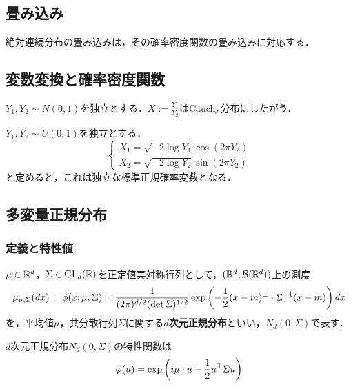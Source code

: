 \documentclass[uplatex,dvipdfmx]{jsreport}
\begin{document}
\subsection{畳み込み}

\begin{tcolorbox}[colframe=ForestGreen, colback=ForestGreen!10!white,breakable,colbacktitle=ForestGreen!40!white,coltitle=black,fonttitle=\bfseries\sffamily,
title=]
    絶対連続分布の畳み込みは，その確率密度関数の畳み込みに対応する．
\end{tcolorbox}

\subsection{変数変換と確率密度関数}

\begin{example}[独立正規分布の比はCauchy分布]
    $Y_1,Y_2\sim N(0,1)$を独立とする．$X:=\frac{Y_1}{Y_2}$はCauchy分布にしたがう．
\end{example}

\begin{example}
    $Y_1,Y_2\sim U(0,1)$を独立とする．
    \[\begin{cases}
        X_1=\sqrt{-2\log Y_1}\cos(2\pi Y_2)\\
        X_2=\sqrt{-2\log Y_2}\sin(2\pi Y_2)
    \end{cases}\]
    と定めると，これは独立な標準正規確率変数となる．
\end{example}

\subsection{多変量正規分布}

\subsubsection{定義と特性値}

\begin{definition}
    $\mu\in\mathbb{R}^d$，$\Sigma\in\mathrm{GL}_d(\mathbb{R})$を正定値実対称行列として，$(\mathbb{R}^d,\mathcal{B}(\mathbb{R}^d))$上の測度
    \[\mu_{\mu,\Sigma}(dx)=\phi(x;\mu,\Sigma)=\frac{1}{(2\pi)^{d/2}(\det\Sigma)^{1/2}}\exp\left(-\frac{1}{2}(x-m)^\perp\cdot\Sigma^{-1}(x-m)\right)dx\]
    を，平均値$\mu$，共分散行列$\Sigma$に関する\textbf{$d$次元正規分布}といい，$N_d(0,\Sigma)$で表す．
\end{definition}

\begin{proposition}
    $d$次元正規分布$N_d(0,\Sigma)$の特性関数は
    \[\varphi(u)=\exp\left(i\mu\cdot u-\frac{1}{2}u^\top\Sigma u\right)\]
\end{proposition}
\end{document}
